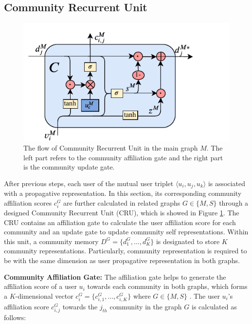 \subsection{Community Recurrent Unit}\label{sc:cru}
\begin{figure}  
	\centering
	\includegraphics[width=1.2\columnwidth]{img/chapter4/cru.pdf}
	\caption{The flow of Community Recurrent Unit in the main graph $M$. The left part refers to the community affiliation gate and the right part is the community update gate.}
	\label{fig:cru}
\end{figure}
After previous steps, each user of the mutual user triplet $\langle u_{i},u_{j},u_{k}\rangle$ is associated with a propagative representation. In this section, its corresponding community affiliation scores $c_{i}^{G}$ are further calculated in related graphs $G \in\{M,S\}$ through a designed Community Recurrent Unit (CRU), which is showed in Figure \ref{fig:cru}. The CRU contains an affiliation gate to calculate the user affiliation score for each community and an update gate to update community self representations. Within this unit, a community memory $D^{G} = \{d_1^G,...,d_K^G\}$ is designated to store $K$ community representations. Particularly, community representation is required to be with the same dimension as user propagative representation in both graphs.


\textbf{Community Affiliation Gate:} The affiliation gate helps to generate the affiliation score of a user $u_i$ towards each community in both graphs, which forms a $K$-dimensional vector $c_{i}^{G} = \{c_{i,1}^{G},...,c_{i,K}^{G}\}$ where $G \in \{M, S\}$ . The user $u_i$'s affiliation score $c_{i,j}^G$ towards the $j_{th}$ community in the graph $G$ is calculated as follows:

